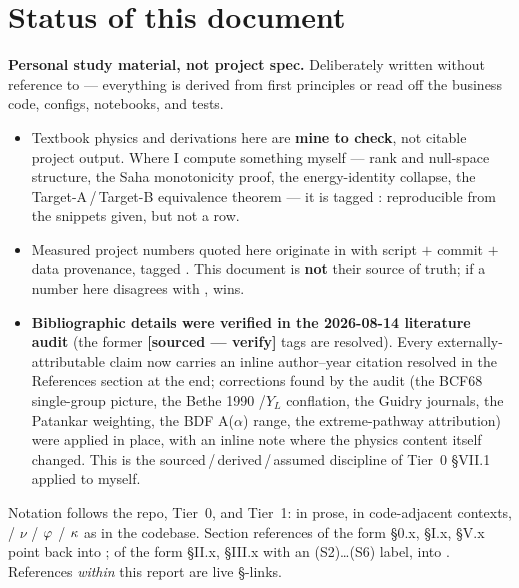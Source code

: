 \section*{Status of this document}
\label{sec:status}

\begin{warn}
\textbf{Personal study material, not project spec.} Deliberately written without
reference to  --- everything is derived from first principles or
read off the business code, configs, notebooks, and tests.
\end{warn}

\begin{itemize}
\item Textbook physics and derivations here are \textbf{mine to check}, not
      citable project output. Where I compute something myself --- rank and
      null-space structure, the Saha monotonicity proof, the energy-identity
      collapse, the Target-A\,/\,Target-B equivalence theorem --- it is tagged
      \derivedhere: reproducible from the snippets given, but not a
       row.

\item Measured project numbers quoted here originate in  with
      script $+$ commit $+$ data provenance, tagged . This
      document is \textbf{not} their source of truth; if a number here
      disagrees with ,  wins.

\item \textbf{Bibliographic details were verified in the 2026-08-14 literature
      audit} (the former \textbf{[sourced --- verify]} tags are resolved). Every
      externally-attributable claim now carries an inline author--year citation
      resolved in the References section at the end; corrections found by the
      audit (the BCF68 single-group picture, the Bethe 1990 \Ye/$Y_L$
      conflation, the Guidry journals, the Patankar weighting, the BDF
      A($\alpha$) range, the extreme-pathway attribution) were applied in place,
      with an inline note where the physics content itself changed. This is the
      sourced\,/\,derived\,/\,assumed discipline of Tier~0 \S VII.1 applied to
      myself.
\end{itemize}

Notation follows the repo, Tier~0, and Tier~1:  in prose,
 in code-adjacent contexts, \Ye{} / $\nu$ / $\varphi$ / $\kappa$ as in
the codebase. Section references of the form \S0.x, \S I.x, \S V.x point back
into ; of the form \S II.x, \S III.x with an (S2)\ldots(S6)
label, into . References \emph{within} this report are live
\S-links.

